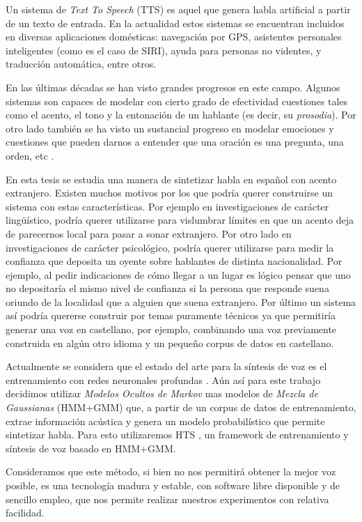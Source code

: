 Un sistema de \textit{Text To Speech} (TTS) es aquel que genera habla artificial a partir de un texto de entrada. En la actualidad estos sistemas se encuentran incluidos en diversas aplicaciones domésticas: navegación por GPS, asistentes personales inteligentes (como es el caso de SIRI), ayuda para personas no videntes, y traducción automática, entre otros.


En las últimas décadas se han visto grandes progresos en este campo. Algunos sistemas son capaces de modelar con cierto grado de efectividad cuestiones tales como el acento, el tono y la entonación de un hablante (es decir, su \textit{prosodia}). Por otro lado también se ha visto un sustancial progreso en modelar emociones y cuestiones que pueden darnos a entender que una oración es una pregunta, una orden, etc \cite{prosodiaYEntonacion} \cite{prosodiaYEntonacion2}. 


En esta tesis se estudia una manera de sintetizar habla en español con acento extranjero. Existen muchos motivos por los que podría querer construirse un sistema con estas características. Por ejemplo en investigaciones de carácter lingüístico, podría querer utilizarse para vislumbrar límites en que un acento deja de parecernos local para pasar a sonar extranjero. Por otro lado en investigaciones de carácter psicológico, podría querer utilizarse para medir la confianza que deposita un oyente sobre hablantes de distinta nacionalidad. Por ejemplo, al pedir indicaciones de cómo llegar a un lugar es lógico pensar que uno no depositaría el mismo nivel de confianza si la persona que responde suena oriundo de la localidad que a alguien que suena extranjero. Por último un sistema así podría quererse construir por temas puramente técnicos ya que permitiría generar una voz en castellano, por ejemplo, combinando una voz previamente construida en algún otro idioma y un pequeño corpus de datos en castellano.


Actualmente se considera que el estado del arte para la síntesis de voz es el entrenamiento con redes neuronales profundas \cite{redesProfundas} \cite{redesProfundas2}. Aún así para este trabajo decidimos utilizar \textit{Modelos Ocultos de Markov} mas modelos de \textit{Mezcla de Gaussianas} (HMM+GMM) que, a partir de un corpus de datos de entrenamiento, extrae información acústica y genera un modelo probabilístico que permite sintetizar habla. Para esto utilizaremos HTS \cite{hts}, un framework de entrenamiento y síntesis de voz basado en HMM+GMM.


Consideramos que este método, si bien no nos permitirá obtener la mejor voz posible, es una tecnología madura y estable, con software libre disponible y de sencillo empleo, que nos permite realizar nuestros experimentos con relativa facilidad.


